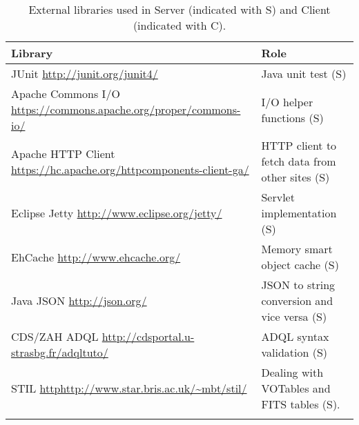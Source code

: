 \documentclass[longauth, final]{aa}
\begin{document}
\begin{table*}[ht]
\caption{External libraries used in Server (indicated with S) and Client (indicated with C).}
\label{tab:libs}
\begin{tabularx}{0.95\textwidth}{XX}
\\\hline
Library & Role \\\hline\noalign{\smallskip}
JUnit \newline \small{\url{http://junit.org/junit4/}} & Java unit test (S)\\    
	\noalign{\smallskip}%

Apache Commons I/O \newline \small{\url{https://commons.apache.org/proper/commons-io/}} & I/O helper functions (S)\\        \noalign{\smallskip}%

Apache HTTP Client \newline \small{\url{https://hc.apache.org/httpcomponents-client-ga/}} & HTTP client to fetch data from other sites (S)\\    
	\noalign{\smallskip}%

Eclipse Jetty \newline \small{\url{http://www.eclipse.org/jetty/}} & Servlet implementation (S)\\    
	\noalign{\smallskip}%

EhCache \newline \small{\url{http://www.ehcache.org/}} & Memory smart object cache (S)\\    
	\noalign{\smallskip}%

Java JSON \newline \small{\url{http://json.org/}} & JSON  to string conversion and vice versa (S)\\    
	\noalign{\smallskip}%

CDS/ZAH ADQL \newline \small{\url{http://cdsportal.u-strasbg.fr/adqltuto/}} & ADQL syntax validation (S)\\    
	\noalign{\smallskip}%

STIL \newline \small{\url{httphttp://www.star.bris.ac.uk/~mbt/stil/}} & Dealing with VOTables and FITS tables (S).\\    
	\noalign{\smallskip}%


\end{tabularx}
\end{table*}
\end{document}
